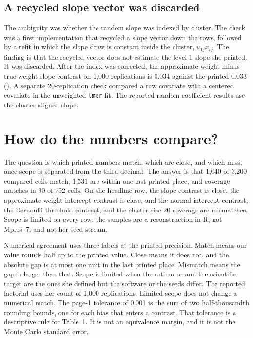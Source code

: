 \subsection{A recycled slope vector was discarded}

The ambiguity was whether the random slope was indexed by cluster.
The check was a first implementation that recycled a slope vector down the
rows, followed by a refit in which the slope draw is constant inside the
cluster, $u_{1j}x_{ij}$.
The finding is that the recycled vector does not estimate the level-1 slope
she printed.
It was discarded.
After the index was corrected, the approximate-weight minus true-weight slope
contrast on 1,000 replications is 0.034 against the printed 0.033
().
A separate 20-replication check compared a raw covariate with a centered
covariate in the unweighted \texttt{lmer} fit.
The reported random-coefficient results use the cluster-aligned slope.

\section{How do the numbers compare?}

The question is which printed numbers match, which are close, and which miss,
once scope is separated from the third decimal.
The answer is that 1,040 of 3,200 compared cells match, 1,531 are within one
last printed place, and coverage matches in 90 of 752 cells.
On the headline row, the slope contrast is close, the approximate-weight
intercept contrast is close, and the normal intercept contrast, the Bernoulli
threshold contrast, and the cluster-size-20 coverage are mismatches.
Scope is limited on every row: the samples are a reconstruction in R, not
Mplus~7, and not her seed stream.

Numerical agreement uses three labels at the printed precision.
Match means our value rounds half up to the printed value.
Close means it does not, and the absolute gap is at most one unit in the last
printed place.
Mismatch means the gap is larger than that.
Scope is limited when the estimator and the scientific target are the ones she
defined but the software or the seeds differ.
The reported factorial uses her count of 1,000 replications.
Limited scope does not change a numerical match.
The page-1 tolerance of 0.001 is the sum of two half-thousandth rounding
bounds, one for each bias that enters a contrast.
That tolerance is a descriptive rule for Table~1.
It is not an equivalence margin, and it is not the Monte Carlo standard error.

